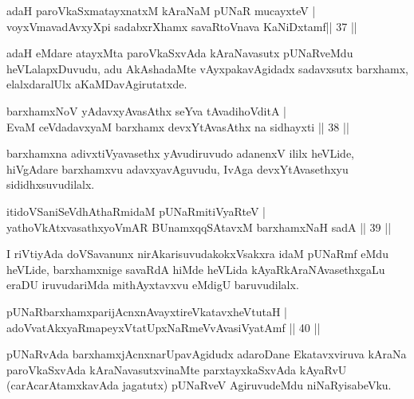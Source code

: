 
\begin{shl} 
adaH paroVkaSxmatayxnatxM kAraNaM pUNaR mucayxteV  | \\
voyxVmavadAvxyXpi sadabxrXhamx savaRtoV\s nava KaNiDxtamf\hfill|| 37 ||
\end{shl}

\begin{artha}
adaH eMdare atayxMta paroVkaSxvAda kAraNavasutx pUNaRveMdu heVLalapxDuvudu, adu AkAshadaMte vAyxpakavAgidadx sadavxsutx barxhamx, elalxdaralUlx aKaMDavAgirutatxde.
\end{artha}

\begin{shl}
barxhamxNoV yA\s davxyAvasAthx seYva tAvadihoVditA  | \\
EvaM ceVdadavxyaM barxhamx devxYtAvasAthx na sidhayxti \hfill||  38 ||  
\end{shl}

\begin{artha}
barxhamxna adivxtiVyavasethx yAvudiruvudo adanenxV ililx heVLide, hiVgAdare barxhamxvu adavxyavAguvudu, IvAga devxYtAvasethxyu sididhxsuvudilalx.
\end{artha}

\begin{shl}
itidoVSaniSeVdhAthaRmidaM pUNaRmitiVyaRteV  | \\
yathoVkAtxvasathxyoVmAR BUnamxqqSAtavxM barxhamxNaH sadA \hfill||  39 ||  
\end{shl}

\begin{artha}
I riVtiyAda doVSavanunx nirAkarisuvudakokxVsakxra idaM pUNaRmf eMdu heVLide, barxhamxnige savaRdA hiMde heVLida kAyaRkAraNAvasethxgaLu eraDU iruvudariMda mithAyxtavxvu eMdigU baruvudilalx.
\end{artha}

\begin{shl}
pUNaRbarxhamxparijAcnxnAvayxtireVkatavxheVtutaH  | \\
adoVvatAkxyaRmapeyxVtatUpxNaRmeVvAvasiVyatAmf \hfill||  40 ||  
\end{shl}

\begin{artha}
pUNaRvAda barxhamxjAcnxnarUpavAgidudx adaroDane Ekatavxviruva kAraNa paroVkaSxvAda kAraNavasutxvinaMte parxtayxkaSxvAda kAyaRvU (carAcarAtamxkavAda jagatutx) pUNaRveV AgiruvudeMdu niNaRyisabeVku.
\end{artha}

